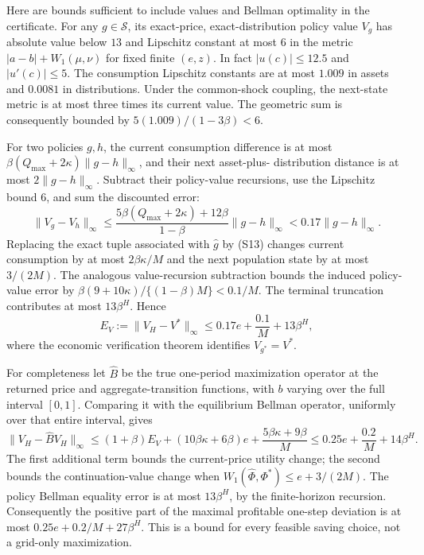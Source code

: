 \documentclass[11pt,a4paper]{article}
\begin{document}
Here are bounds sufficient to include values and Bellman optimality
in the certificate. For any $g\in\mathcal S$, its exact-price,
exact-distribution policy value $V_g$ has absolute value below $13$
and Lipschitz constant at most $6$ in the metric $|a-b|+W_1(\mu,\nu)$
for fixed finite $(e,z)$. In fact $|u(c)|\leq12.5$ and $|u'(c)|\leq5$.
The consumption Lipschitz constants are at most $1.009$ in assets
and $0.0081$ in distributions. Under the common-shock coupling,
the next-state metric is at most three times its current value.
The geometric sum is consequently bounded by
$5(1.009)/(1-3\beta)<6$.

For two policies $g,h$, the current consumption difference is at most
$\beta(Q_{\max}+2\kappa)\|g-h\|_\infty$, and their next asset-plus-
distribution distance is at most $2\|g-h\|_\infty$. Subtract their
policy-value recursions, use the Lipschitz bound $6$, and sum the
discounted error:
\[
 \|V_g-V_h\|_\infty
 \leq
 \frac{5\beta(Q_{\max}+2\kappa)+12\beta}{1-\beta}
 \|g-h\|_\infty
 <0.17\|g-h\|_\infty .
 \tag{S16}
\]
Replacing the exact tuple associated with $\hat g$ by
\textup{(S13)} changes current consumption by at most
$2\beta\kappa/M$ and the next population state by at most $3/(2M)$.
The analogous value-recursion subtraction bounds the induced
policy-value error by
$\beta(9+10\kappa)/\{(1-\beta)M\}<0.1/M$.
The terminal truncation contributes at most $13\beta^H$. Hence
\[
 E_V:=\|V_H-V^*\|_\infty
 \leq0.17e+\frac{0.1}{M}+13\beta^H,
 \tag{S17}
\]
where the economic verification theorem identifies $V_{g^*}=V^*$.

For completeness let $\hat B$ be the true one-period maximization
operator at the returned price and aggregate-transition functions,
with $b$ varying over the full interval $[0,1]$. Comparing it with the
equilibrium Bellman operator, uniformly over that entire interval,
gives
\[
 \|V_H-\hat B V_H\|_\infty
 \leq(1+\beta)E_V+
 (10\beta\kappa+6\beta)e+
 \frac{5\beta\kappa+9\beta}{M}
 \leq0.25e+\frac{0.2}{M}+14\beta^H .
 \tag{S18}
\]
The first additional term bounds the current-price utility change;
the second bounds the continuation-value change when
$W_1(\hat\Phi,\Phi^*)\leq e+3/(2M)$.
The policy Bellman equality error is at most $13\beta^H$, by the
finite-horizon recursion. Consequently the positive part of the
maximal profitable one-step deviation is at most
$0.25e+0.2/M+27\beta^H$. This is a bound for every feasible saving
choice, not a grid-only maximization.
\end{document}
